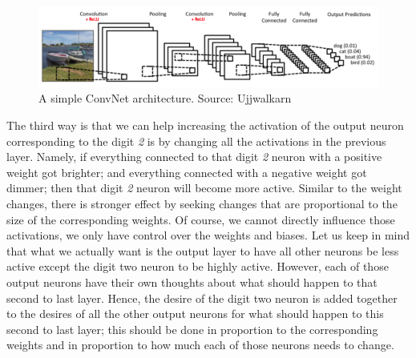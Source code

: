 \documentclass[master]{thesis-uestc}
\begin{document}
\begin{figure}[ht]
\includegraphics[width=5in]{pic/ConvNet_Arch.png}
\caption{A simple ConvNet architecture. Source: Ujjwalkarn\cite{intuitiveCNN}}
\label{ConvNet_arch}
\end{figure}

The third way is that we can help increasing the activation of the output neuron corresponding to the digit \textit{2} is by changing all the activations in the previous layer. Namely, if everything connected to that digit \textit{2} neuron with a positive weight got brighter; and everything connected with a negative weight got dimmer; then that digit \textit{2} neuron will become more active. Similar to the weight changes, there is stronger effect by seeking changes that are proportional to the size of the corresponding weights. Of course, we cannot directly influence those activations, we only have control over the weights and biases. Let us keep in mind that what we actually want is the output layer to have all other neurons be less active except the digit two neuron to be highly active. However, each of those output neurons have their own thoughts about what should happen to that second to last layer. Hence, the desire of the digit two neuron is added together to the desires of all the other output neurons for what should happen to this second to last layer; this should be done in proportion to the corresponding weights and in proportion to how much each of those neurons needs to change.
\end{document}
